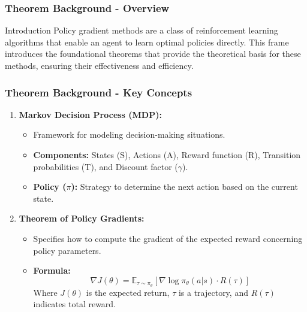 \documentclass[aspectratio=169]{beamer}
\begin{document}
\begin{frame}[fragile]
    \frametitle{Theorem Background - Overview}
    \begin{block}{Introduction}
        Policy gradient methods are a class of reinforcement learning algorithms that enable an agent to learn optimal policies directly. 
        This frame introduces the foundational theorems that provide the theoretical basis for these methods, ensuring their effectiveness and efficiency.
    \end{block}
\end{frame}

\begin{frame}[fragile]
    \frametitle{Theorem Background - Key Concepts}
    \begin{enumerate}
        \item \textbf{Markov Decision Process (MDP):}
            \begin{itemize}
                \item Framework for modeling decision-making situations.
                \item \textbf{Components:} States (S), Actions (A), Reward function (R), Transition probabilities (T), and Discount factor ($\gamma$).
                \item \textbf{Policy ($\pi$):} Strategy to determine the next action based on the current state.
            \end{itemize}
        
        \item \textbf{Theorem of Policy Gradients:}
            \begin{itemize}
                \item Specifies how to compute the gradient of the expected reward concerning policy parameters.
                \item \textbf{Formula:} 
                \begin{equation}
                \nabla J(\theta) = \mathbb{E}_{\tau \sim \pi_\theta} \left[ \nabla \log \pi_\theta(a | s) \cdot R(\tau) \right]
                \end{equation}
                Where $J(\theta)$ is the expected return, $\tau$ is a trajectory, and $R(\tau)$ indicates total reward.
            \end{itemize}
    \end{enumerate}
\end{frame}
\end{document}
